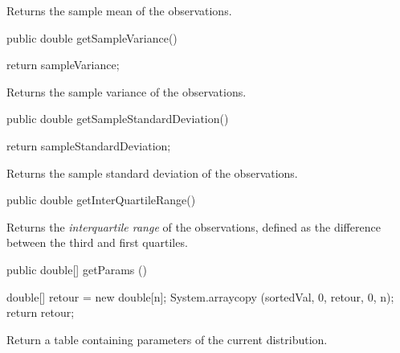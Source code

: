 \begin{tabb}   Returns the sample mean of the observations.
\end{tabb}
\begin{code}

   public double getSampleVariance()\begin{hide} {
      return sampleVariance;
   }\end{hide}
\end{code}
\begin{tabb}   Returns the sample variance of the observations.
\end{tabb}
\begin{code}

   public double getSampleStandardDeviation()\begin{hide} {
      return sampleStandardDeviation;
   }\end{hide}
\end{code}
\begin{tabb}   Returns the sample standard deviation of the observations.
\end{tabb}
\begin{code}

   public double getInterQuartileRange()
\end{code}
\begin{tabb}   Returns the \emph{interquartile range} of the observations,
   defined as the difference between the third and first quartiles.
\end{tabb}
\begin{code}

   public double[] getParams ()\begin{hide} {
      double[] retour = new double[n];
      System.arraycopy (sortedVal, 0, retour, 0, n);
      return retour;
   }\end{hide}
\end{code}
\begin{tabb}
   Return a table containing parameters of the current distribution.
\end{tabb}
